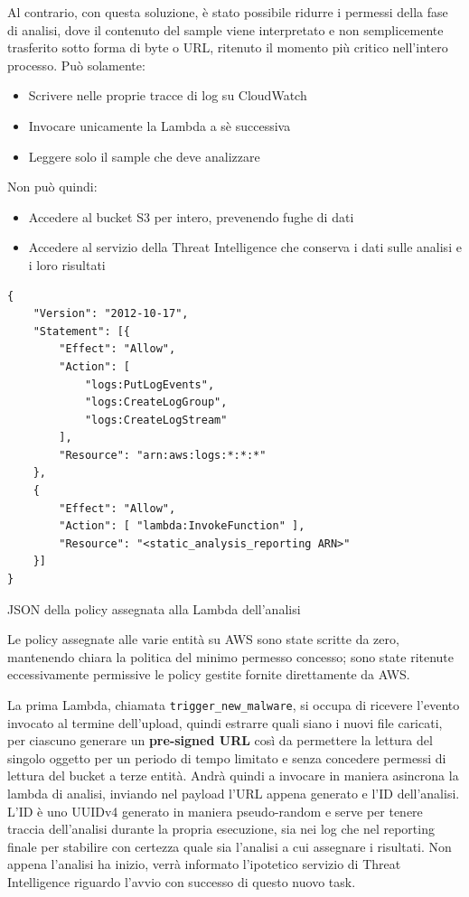 Al contrario, con questa soluzione, è stato possibile ridurre i permessi della fase di analisi, dove il contenuto del sample viene interpretato e non semplicemente trasferito sotto forma di byte o URL, ritenuto il momento più critico nell'intero processo. Può solamente:
\begin{itemize}
    \item Scrivere nelle proprie tracce di log su CloudWatch
    \item Invocare unicamente la Lambda a sè successiva
    \item Leggere solo il sample che deve analizzare
\end{itemize}

\noindent Non può quindi:
\begin{itemize}
    \item Accedere al bucket S3 per intero, prevenendo fughe di dati
    \item Accedere al servizio della Threat Intelligence che conserva i dati sulle analisi e i loro risultati
\end{itemize}

\begin{code}
\begin{verbatim}
{
    "Version": "2012-10-17",
    "Statement": [{
        "Effect": "Allow",
        "Action": [
            "logs:PutLogEvents",
            "logs:CreateLogGroup",
            "logs:CreateLogStream"
        ],
        "Resource": "arn:aws:logs:*:*:*"
    },
    {
        "Effect": "Allow",
        "Action": [ "lambda:InvokeFunction" ],
        "Resource": "<static_analysis_reporting ARN>"
    }]
}
\end{verbatim}
\label{code:aws_static_analysis_lambda_policy}
\caption{JSON della policy assegnata alla Lambda dell'analisi}
\end{code}

Le policy assegnate alle varie entità su AWS sono state scritte da zero, mantenendo chiara la politica del minimo permesso concesso; sono state ritenute eccessivamente permissive le policy gestite fornite direttamente da AWS.

\medskip

La prima Lambda, chiamata \texttt{trigger\_new\_malware}, si occupa di ricevere l'evento invocato al termine dell'upload, quindi estrarre quali siano i nuovi file caricati, per ciascuno generare un \textbf{pre-signed URL} così da permettere la lettura del singolo oggetto per un periodo di tempo limitato e senza concedere permessi di lettura del bucket a terze entità.
Andrà quindi a invocare in maniera asincrona la lambda di analisi, inviando nel payload l'URL appena generato e l'ID dell'analisi. L'ID è uno UUIDv4 generato in maniera pseudo-random e serve per tenere traccia dell'analisi durante la propria esecuzione, sia nei log che nel reporting finale per stabilire con certezza quale sia l'analisi a cui assegnare i risultati. Non appena l'analisi ha inizio, verrà informato l'ipotetico servizio di Threat Intelligence riguardo l'avvio con successo di questo nuovo task.

